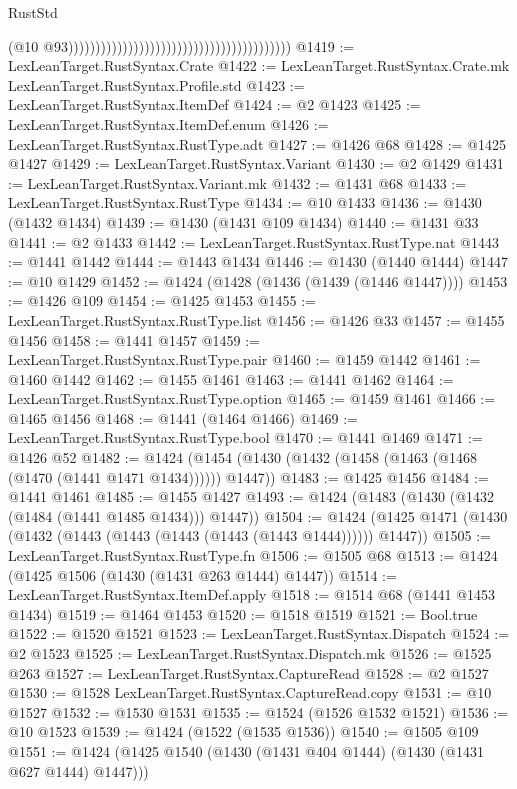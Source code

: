 \begin{lexlean}{RustStd}
\begin{coremodule}
                                                                                    (@10
                                                                                      @93)))))))))))))))))))))))))))))))))))))))))
@1419 := LexLeanTarget.RustSyntax.Crate
@1422 := LexLeanTarget.RustSyntax.Crate.mk LexLeanTarget.RustSyntax.Profile.std
@1423 := LexLeanTarget.RustSyntax.ItemDef
@1424 := @2 @1423
@1425 := LexLeanTarget.RustSyntax.ItemDef.enum
@1426 := LexLeanTarget.RustSyntax.RustType.adt
@1427 := @1426 @68
@1428 := @1425 @1427
@1429 := LexLeanTarget.RustSyntax.Variant
@1430 := @2 @1429
@1431 := LexLeanTarget.RustSyntax.Variant.mk
@1432 := @1431 @68
@1433 := LexLeanTarget.RustSyntax.RustType
@1434 := @10 @1433
@1436 := @1430 (@1432 @1434)
@1439 := @1430 (@1431 @109 @1434)
@1440 := @1431 @33
@1441 := @2 @1433
@1442 := LexLeanTarget.RustSyntax.RustType.nat
@1443 := @1441 @1442
@1444 := @1443 @1434
@1446 := @1430 (@1440 @1444)
@1447 := @10 @1429
@1452 := @1424 (@1428 (@1436 (@1439 (@1446 @1447))))
@1453 := @1426 @109
@1454 := @1425 @1453
@1455 := LexLeanTarget.RustSyntax.RustType.list
@1456 := @1426 @33
@1457 := @1455 @1456
@1458 := @1441 @1457
@1459 := LexLeanTarget.RustSyntax.RustType.pair
@1460 := @1459 @1442
@1461 := @1460 @1442
@1462 := @1455 @1461
@1463 := @1441 @1462
@1464 := LexLeanTarget.RustSyntax.RustType.option
@1465 := @1459 @1461
@1466 := @1465 @1456
@1468 := @1441 (@1464 @1466)
@1469 := LexLeanTarget.RustSyntax.RustType.bool
@1470 := @1441 @1469
@1471 := @1426 @52
@1482 := @1424 (@1454 (@1430 (@1432 (@1458 (@1463 (@1468 (@1470 (@1441 @1471 @1434)))))) @1447))
@1483 := @1425 @1456
@1484 := @1441 @1461
@1485 := @1455 @1427
@1493 := @1424 (@1483 (@1430 (@1432 (@1484 (@1441 @1485 @1434))) @1447))
@1504 := @1424 (@1425 @1471 (@1430 (@1432 (@1443 (@1443 (@1443 (@1443 (@1443 @1444)))))) @1447))
@1505 := LexLeanTarget.RustSyntax.RustType.fn
@1506 := @1505 @68
@1513 := @1424 (@1425 @1506 (@1430 (@1431 @263 @1444) @1447))
@1514 := LexLeanTarget.RustSyntax.ItemDef.apply
@1518 := @1514 @68 (@1441 @1453 @1434)
@1519 := @1464 @1453
@1520 := @1518 @1519
@1521 := Bool.true
@1522 := @1520 @1521
@1523 := LexLeanTarget.RustSyntax.Dispatch
@1524 := @2 @1523
@1525 := LexLeanTarget.RustSyntax.Dispatch.mk
@1526 := @1525 @263
@1527 := LexLeanTarget.RustSyntax.CaptureRead
@1528 := @2 @1527
@1530 := @1528 LexLeanTarget.RustSyntax.CaptureRead.copy
@1531 := @10 @1527
@1532 := @1530 @1531
@1535 := @1524 (@1526 @1532 @1521)
@1536 := @10 @1523
@1539 := @1424 (@1522 (@1535 @1536))
@1540 := @1505 @109
@1551 := @1424 (@1425 @1540 (@1430 (@1431 @404 @1444) (@1430 (@1431 @627 @1444) @1447)))

\end{coremodule}
\end{lexlean}
